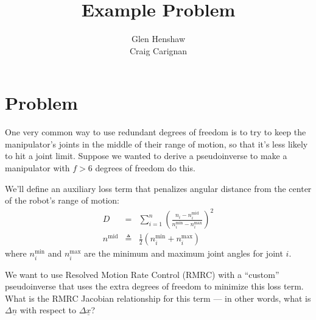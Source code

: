 \documentclass[]{article}
\title{Example Problem}
\author{Glen Henshaw\\Craig Carignan}
\begin{document}
\maketitle

\section{Problem}

One very common way to use redundant degrees of freedom is to try to keep the manipulator's joints in the middle of their range of motion, so that it's less likely to hit a joint limit. Suppose we wanted to derive a pseudoinverse to make a manipulator with $f>6$ degrees of freedom do this.

We'll define an auxiliary loss term that penalizes angular distance from the center of the robot's range of motion:
\begin{eqnarray}
D & = & \sum_{i=1}^{n} \left( \frac{n_{i}-n_{i}^{\mathrm{mid}}}{n_{i}^{\mathrm{min}}-n_{i}^{\mathrm{max}}}\right)^{2} \\
n^{\mathrm{mid}} & \triangleq & \frac{1}{2}\left( n_{i}^{\mathrm{min}} + n_{i}^{\mathrm{max}} \right)
\end{eqnarray}
where $n_{i}^{\mathrm{min}}$ and $n_{i}^{\mathrm{max}}$ are the minimum and maximum joint angles for joint $i$.
 
 We want to use Resolved Motion Rate Control (RMRC) with a ``custom'' pseudoinverse that uses the extra degrees of freedom to minimize this loss term. What is the RMRC Jacobian relationship for this term --- in other words, what is $\Delta \underline{n}$ with respect to $\Delta\underline{x}$?
\end{document}
